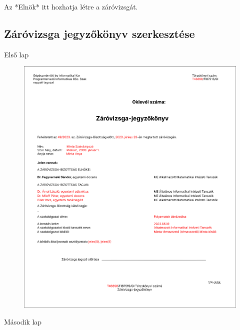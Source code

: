 \documentclass[a4paper,12pt]{article}
\begin{document}
Az *Elnök* itt hozhatja létre a záróvizsgát.

\subsection{Záróvizsga jegyzőkönyv szerkesztése}


Első lap

\begin{figure}
	\centering
	\includegraphics[width=\textwidth]{images/Web_pages/Zv_Report1.png}
	\caption{}
	\label{fig:Zv_Report1}
\end{figure}

Második lap
\end{document}
